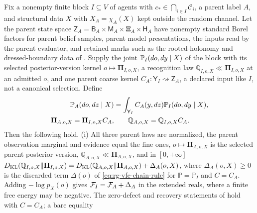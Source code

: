 \label{eq:rg-pointwise-parent-overlap}
\label{eq:rg-pointwise-parent-space}
\label{eq:rg-pointwise-parent-channel}
\label{eq:rg-pointwise-parent-kl-chain}
\label{eq:rg-pointwise-parent-defect}
\label{eq:rg-pointwise-parent-evaluator}
\label{eq:rg-pointwise-parent-evaluator-compatibility}
\label{eq:rg-pointwise-parent-recognition-marginals}
\label{eq:rg-pointwise-parent-prior-marginals}
\label{eq:rg-pointwise-parent-posterior-marginals}
Fix a nonempty finite block $I\subseteq V$ of agents with $c_*\in\bigcap_{i\in I}\mathcal C_i$, a
parent label $A$, and structural data $X$ with $X_A=\chi_A(X)$ kept outside the random channel. Let
the parent state space
$\mathsf Z_A=\mathsf B_A\times\mathsf M_A\times\boldsymbol\Xi_A\times\mathsf H_A$ have nonempty
standard Borel factors for parent belief samples, parent model presentations, the inputs read by
the parent evaluator, and retained marks such as the rooted-holonomy and dressed-boundary data of
. Supply the joint $\mathbb P_I(do,dy\mid X)$ of the block with
its selected posterior-version kernel $o\mapsto\boldsymbol\Pi_{I,o,X}$, a recognition law
$\mathbb Q_{I,o,X}\ll\boldsymbol\Pi_{I,o,X}$ at an admitted $o$, and one parent coarse kernel
$C_A:\mathsf Y_I\rightsquigarrow\mathsf Z_A$, a declared input like $I$, not a canonical selection.
Define
\begin{align}
\mathbb P_A(do,dz\mid X)&=\int_{\mathsf Y_I}C_A(y,dz)\mathbb P_I(do,dy\mid X),
\label{eq:rg-pointwise-parent-generative}\\
\boldsymbol\Pi_{A,o,X}=\boldsymbol\Pi_{I,o,X}C_A,&\qquad
\mathbb Q_{A,o,X}=\mathbb Q_{I,o,X}C_A.
\label{eq:rg-pointwise-parent-triple}
\end{align}
Then the following hold. (i) All three parent laws are normalized, the parent observation marginal
and evidence equal the fine ones, $o\mapsto\boldsymbol\Pi_{A,o,X}$ is the selected parent posterior
version, $\mathbb Q_{A,o,X}\ll\boldsymbol\Pi_{A,o,X}$, and in $[0,+\infty]$
$D_{\mathrm{KL}}(\mathbb Q_{I,o,X}\Vert\boldsymbol\Pi_{I,o,X})
=D_{\mathrm{KL}}(\mathbb Q_{A,o,X}\Vert\boldsymbol\Pi_{A,o,X})+\Delta_A(o,X)$, where $\Delta_A(o,X)\geq0$ is
the discarded term $\Delta(o)$ of \eqref{eq:rg-vfe-chain-rule} for
$\mathbb P=\mathbb P_I$ and $C=C_A$. Adding $-\log p_X(o)$ gives $\mathcal F_I=\mathcal F_A+\Delta_A$ in
the extended reals, where a finite free energy may be negative. The zero-defect and recovery
statements of  hold with $C=C_A$; a bare equality
